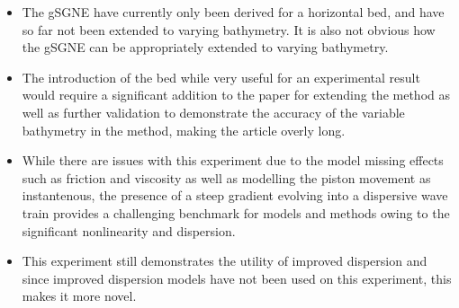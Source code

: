 \documentclass[10pt]{article}
\begin{document}
\begin{itemize}
	\item The gSGNE have currently only been derived for a horizontal bed, and have so far not been extended to varying bathymetry. It is also not obvious how the gSGNE can be appropriately extended to varying bathymetry. 
	\item The introduction of the bed while very useful for an experimental result would require a significant addition to the paper for extending the method as well as further validation to demonstrate the accuracy of the variable bathymetry in the method, making the article overly long. 
	\item While there are issues with this experiment due to  the model missing effects such as friction and viscosity as well as modelling the piston movement as instantenous, the presence of a steep gradient evolving into a dispersive wave train provides a challenging benchmark for models and methods owing to the significant nonlinearity and dispersion. 
	\item This experiment still demonstrates the utility of improved dispersion and since improved dispersion models have not been used on this experiment, this makes it more novel. 
	 
\end{itemize}

 

\end{document}
